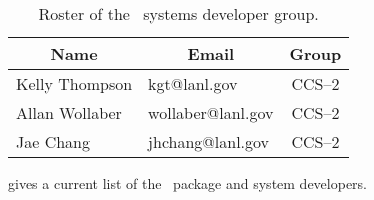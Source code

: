\begin{table}
  \begin{center}
    \caption{Roster of the \draco\ systems developer group.}
    \label{tab:draco_system}
    \begin{tabular}{llc}\hline\hline
      \multicolumn{1}{c}{Name} & \multicolumn{1}{c}{Email} &
      Group \\ \hline
      Kelly Thompson & kgt@lanl.gov & CCS--2 \\
      Allan Wollaber & wollaber@lanl.gov & CCS--2 \\
      Jae Chang & jhchang@lanl.gov & CCS--2 \\
\hline\hline
    \end{tabular}
  \end{center}
\end{table}
gives a current list of the \draco\ package and system developers.

